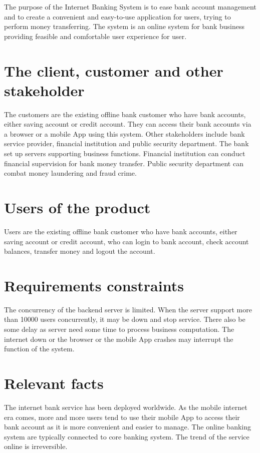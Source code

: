 \documentclass{scrreprt}
\begin{document}
The purpose of the Internet Banking System is to ease bank account management and to create a convenient and easy-to-use application for users, trying to perform money transferring. The system is an online system for bank business providing feasible and comfortable user experience for user.

\section{The client, customer and other stakeholder}
The customers are the existing offline bank customer who have bank accounts, either saving account or credit account. They can access their bank accounts via a browser or a mobile App using this system. Other stakeholders include bank service provider, financial institution and public security department. The bank set up servers supporting business functions. Financial institution can conduct financial supervision for bank money transfer. Public security department can combat money laundering and fraud crime.

\section{Users of the product}
Users are the existing offline bank customer who have bank accounts, either saving account or credit account, who can login to bank account, check account balances, transfer money and logout the account.


\section{Requirements constraints}
The concurrency of the backend server is limited. When the server support more than 10000 users concurrently, it may be down and stop service. 
There also be some delay as server need some time to process business computation. The internet down or the browser or the mobile App crashes may interrupt the function of the system.



\section{Relevant facts}
The internet bank service has been deployed worldwide. As the mobile internet era comes, more and more users tend to use their mobile App to access their bank account as it is more convenient and easier to manage. The online banking system are typically connected to core banking system. The trend of the service online is irreversible.
\end{document}
